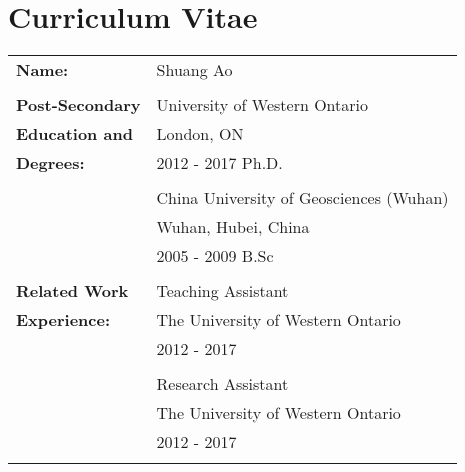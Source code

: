 \documentclass[12pt,twoside]{report}
\numberwithin{figure}{chapter}
\newcommand{\firstname}{Shuang}
\newcommand{\lastname}{Ao}
\begin{document}
	\begin{appendices}
		
	\end{appendices}
	
	\chapter*{Curriculum Vitae}
	\begin{table}[ht]
		\begin{tabular}{ll}
			\textbf{Name:} & \firstname{} \lastname\\\\
			\textbf{Post-Secondary} &  University of Western Ontario\\
			\textbf{Education and}& London, ON\\
			\textbf{Degrees:}& 2012 - 2017 Ph.D.\\\\
			& China University of Geosciences (Wuhan)\\
			& Wuhan, Hubei, China\\
			& 2005 - 2009 B.Sc\\\\
			\textbf{Related Work}& Teaching Assistant\\
			\textbf{Experience:}& The University of Western Ontario\\
			& 2012 - 2017\\\\
			
			& Research Assistant\\
			& The University of Western Ontario\\
			& 2012 - 2017\\\\
		\end{tabular}
	\end{table}
\end{document}
